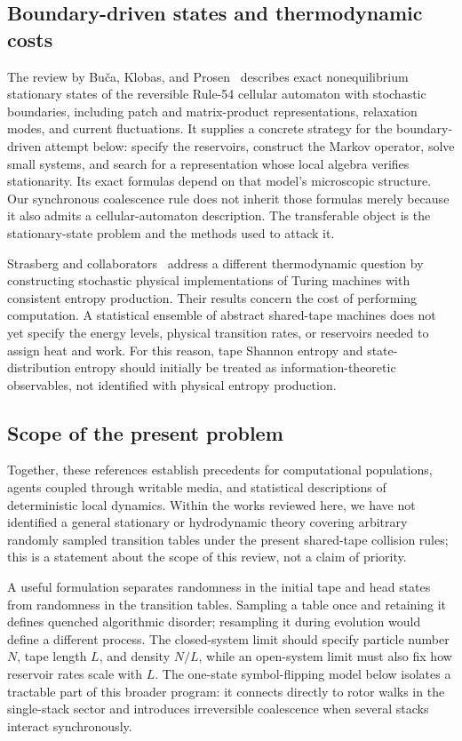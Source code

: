 \documentclass{article}
\begin{document}
\subsection{Boundary-driven states and thermodynamic costs}

The review by Bu\v{c}a, Klobas, and
Prosen~\citep{buca2021rule54} describes exact nonequilibrium stationary
states of the reversible Rule-54 cellular automaton with stochastic
boundaries, including patch and matrix-product representations, relaxation
modes, and current fluctuations.  It supplies a concrete strategy for the
boundary-driven attempt below: specify the reservoirs, construct the
Markov operator, solve small systems, and search for a representation
whose local algebra verifies stationarity.  Its exact formulas depend on
that model's microscopic structure.  Our synchronous coalescence rule
does not inherit those formulas merely because it also admits a
cellular-automaton description.  The transferable object is the
stationary-state problem and the methods used to attack it.

Strasberg and collaborators~\citep{strasberg2015thermodynamics} address a
different thermodynamic question by constructing stochastic physical
implementations of Turing machines with consistent entropy production.
Their results concern the cost of performing computation.  A statistical
ensemble of abstract shared-tape machines does not yet specify the energy
levels, physical transition rates, or reservoirs needed to assign heat
and work.  For this reason, tape Shannon entropy and state-distribution
entropy should initially be treated as information-theoretic observables,
not identified with physical entropy production.

\subsection{Scope of the present problem}

Together, these references establish precedents for computational
populations, agents coupled through writable media, and statistical
descriptions of deterministic local dynamics.  Within the works reviewed
here, we have not identified a general stationary or hydrodynamic theory
covering arbitrary randomly sampled transition tables under the present
shared-tape collision rules; this is a statement about the scope of this
review, not a claim of priority.

A useful formulation separates randomness in the initial tape and head
states from randomness in the transition tables.  Sampling a table once
and retaining it defines quenched algorithmic disorder; resampling it
during evolution would define a different process.  The closed-system
limit should specify particle number $N$, tape length $L$, and density
$N/L$, while an open-system limit must also fix how reservoir rates scale
with $L$.  The one-state symbol-flipping model below isolates a tractable
part of this broader program: it connects directly to rotor walks in the
single-stack sector and introduces irreversible coalescence when several
stacks interact synchronously.
\end{document}
